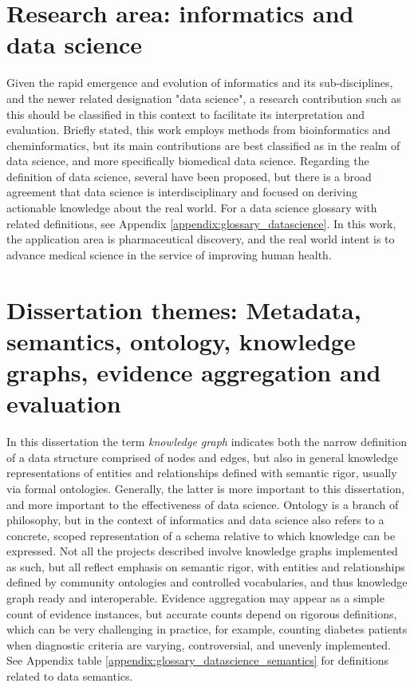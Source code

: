 \section{Research area: informatics and data science}

Given the rapid emergence and evolution of informatics and its sub-disciplines, and the newer related designation "data science", a research contribution such as this should be classified in this context to facilitate its interpretation and evaluation. Briefly stated, this work employs methods from bioinformatics and cheminformatics, but its main contributions are best classified as in the realm of data science, and more specifically biomedical data science. Regarding the definition of data science, several have been proposed\cite{ONeil2013-je,Peng2016-gq}, but there is a broad agreement that data science is interdisciplinary and focused on deriving actionable knowledge about the real world. For a data science glossary with related definitions, see Appendix \ref{appendix:glossary_datascience}. In this work, the application area is pharmaceutical discovery, and the real world intent is to advance medical science in the service of improving human health.

\section{Dissertation themes: Metadata, semantics, ontology, knowledge graphs, evidence aggregation and evaluation}

In this dissertation the term \textit{knowledge graph} indicates both the narrow definition of a data structure comprised of nodes and edges, but also in general knowledge representations of entities and relationships defined with semantic rigor, usually via formal ontologies. Generally, the latter is more important to this dissertation, and more important to the effectiveness of data science. Ontology is a branch of philosophy, but in the context of informatics and data science also refers to a concrete, scoped representation of a schema relative to which knowledge can be expressed. Not all the projects described involve knowledge graphs implemented as such, but all reflect emphasis on semantic rigor, with entities and relationships defined by community ontologies and controlled vocabularies, and thus knowledge graph ready and interoperable. Evidence aggregation may appear as a simple count of evidence instances, but accurate counts depend on rigorous definitions, which can be very challenging in practice, for example, counting diabetes patients when diagnostic criteria are varying, controversial, and unevenly implemented. See Appendix table \ref{appendix:glossary_datascience_semantics} for definitions related to data semantics.

